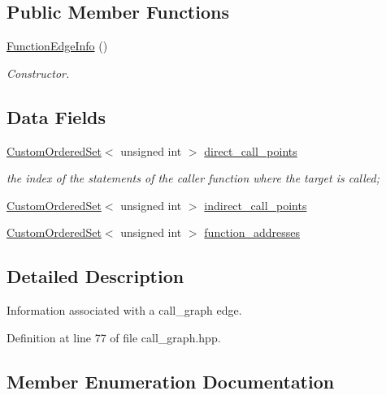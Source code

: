 \subsection*{Public Member Functions}
\begin{DoxyCompactItemize}
\item 
\hyperlink{structFunctionEdgeInfo_aaadeb68f02787ec0ba752c4da892fcdc}{Function\+Edge\+Info} ()
\begin{DoxyCompactList}\small\item\em Constructor. \end{DoxyCompactList}\end{DoxyCompactItemize}
\subsection*{Data Fields}
\begin{DoxyCompactItemize}
\item 
\hyperlink{classCustomOrderedSet}{Custom\+Ordered\+Set}$<$ unsigned int $>$ \hyperlink{structFunctionEdgeInfo_a554509310906374822a4f0df057024ac}{direct\+\_\+call\+\_\+points}
\begin{DoxyCompactList}\small\item\em the index of the statements of the caller function where the target is called; \end{DoxyCompactList}\item 
\hyperlink{classCustomOrderedSet}{Custom\+Ordered\+Set}$<$ unsigned int $>$ \hyperlink{structFunctionEdgeInfo_a83be633ec281bd32d7ff3552fd40e758}{indirect\+\_\+call\+\_\+points}
\item 
\hyperlink{classCustomOrderedSet}{Custom\+Ordered\+Set}$<$ unsigned int $>$ \hyperlink{structFunctionEdgeInfo_af19373bf4bf8c9c68476b9d5c1a48fd0}{function\+\_\+addresses}
\end{DoxyCompactItemize}


\subsection{Detailed Description}
Information associated with a call\+\_\+graph edge. 

Definition at line 77 of file call\+\_\+graph.\+hpp.



\subsection{Member Enumeration Documentation}
\mbox{\label{structFunctionEdgeInfo_a39413ce8498ca68ed43c3f171f2607ef}} 

